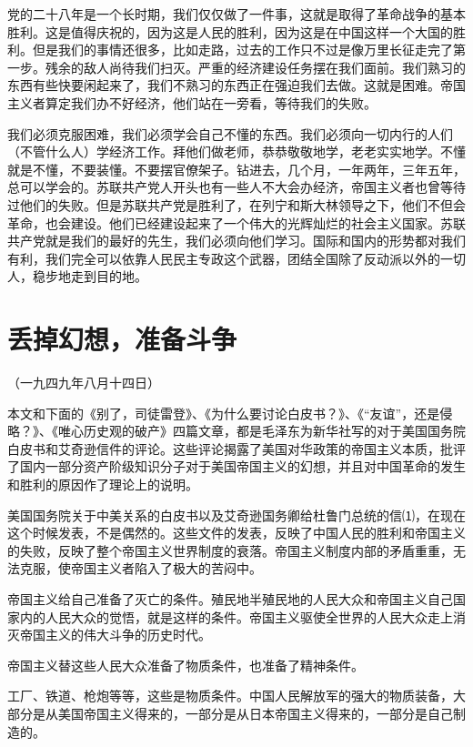 \documentclass[UTF-8, a5paper, 12pt]{ctexart}
\begin{document}
党的二十八年是一个长时期，我们仅仅做了一件事，这就是取得了革命战争的基本胜利。这是值得庆祝的，因为这是人民的胜利，因为这是在中国这样一个大国的胜利。但是我们的事情还很多，比如走路，过去的工作只不过是像万里长征走完了第一步。残余的敌人尚待我们扫灭。严重的经济建设任务摆在我们面前。我们熟习的东西有些快要闲起来了，我们不熟习的东西正在强迫我们去做。这就是困难。帝国主义者算定我们办不好经济，他们站在一旁看，等待我们的失败。

我们必须克服困难，我们必须学会自己不懂的东西。我们必须向一切内行的人们（不管什么人）学经济工作。拜他们做老师，恭恭敬敬地学，老老实实地学。不懂就是不懂，不要装懂。不要摆官僚架子。钻进去，几个月，一年两年，三年五年，总可以学会的。苏联共产党人开头也有一些人不大会办经济，帝国主义者也曾等待过他们的失败。但是苏联共产党是胜利了，在列宁和斯大林领导之下，他们不但会革命，也会建设。他们已经建设起来了一个伟大的光辉灿烂的社会主义国家。苏联共产党就是我们的最好的先生，我们必须向他们学习。国际和国内的形势都对我们有利，我们完全可以依靠人民民主专政这个武器，团结全国除了反动派以外的一切人，稳步地走到目的地。

\section{丢掉幻想，准备斗争}

（一九四九年八月十四日）

本文和下面的《别了，司徒雷登》、《为什么要讨论白皮书？》、《“友谊”，还是侵略？》、《唯心历史观的破产》四篇文章，都是毛泽东为新华社写的对于美国国务院白皮书和艾奇逊信件的评论。这些评论揭露了美国对华政策的帝国主义本质，批评了国内一部分资产阶级知识分子对于美国帝国主义的幻想，并且对中国革命的发生和胜利的原因作了理论上的说明。

美国国务院关于中美关系的白皮书以及艾奇逊国务卿给杜鲁门总统的信⑴，在现在这个时候发表，不是偶然的。这些文件的发表，反映了中国人民的胜利和帝国主义的失败，反映了整个帝国主义世界制度的衰落。帝国主义制度内部的矛盾重重，无法克服，使帝国主义者陷入了极大的苦闷中。

帝国主义给自己准备了灭亡的条件。殖民地半殖民地的人民大众和帝国主义自己国家内的人民大众的觉悟，就是这样的条件。帝国主义驱使全世界的人民大众走上消灭帝国主义的伟大斗争的历史时代。

帝国主义替这些人民大众准备了物质条件，也准备了精神条件。

工厂、铁道、枪炮等等，这些是物质条件。中国人民解放军的强大的物质装备，大部分是从美国帝国主义得来的，一部分是从日本帝国主义得来的，一部分是自己制造的。
\end{document}
